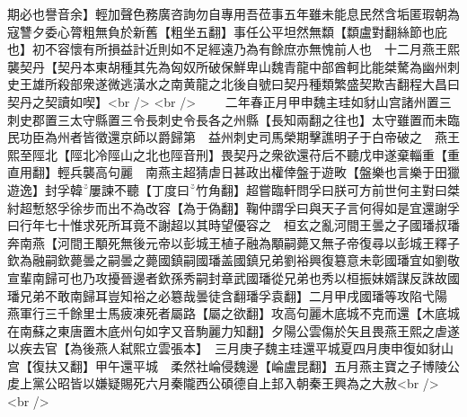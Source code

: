 期必也譽音余】輕加聲色務廣咨詢勿自專用吾莅事五年雖未能息民然含垢匿瑕朝為寇讐夕委心膂粗無負於新舊【粗坐五翻】事任公平坦然無纇【纇盧對翻絲節也庇也】初不容懷有所損益計近則如不足經遠乃為有餘庶亦無愧前人也　十二月燕王熙襲契丹【契丹本東胡種其先為匈奴所破保鮮卑山魏青龍中部酋軻比能桀驁為幽州刺史王雄所殺部衆遂微逃潢水之南黄龍之北後自號曰契丹種類繁盛契欺吉翻程大昌曰契丹之契讀如喫】<br />
<br />
　　二年春正月甲申魏主珪如豺山宫諸州置三刺史郡置三太守縣置三令長刺史令長各之州縣【長知兩翻之往也】太守雖置而未臨民功臣為州者皆徵還京師以爵歸第　益州刺史司馬榮期擊譙明子于白帝破之　燕王熙至陘北【陘北冷陘山之北也陘音刑】畏契丹之衆欲還苻后不聽戊申遂棄輜重【重直用翻】輕兵襲高句麗　南燕主超猜虐日甚政出權倖盤于遊畋【盤樂也言樂于田獵遊逸】封孚韓屢諫不聽【丁度曰竹角翻】超嘗臨軒問孚曰朕可方前世何主對曰桀紂超慙怒孚徐步而出不為改容【為于偽翻】鞠仲謂孚曰與天子言何得如是宜還謝孚曰行年七十惟求死所耳竟不謝超以其時望優容之　桓玄之亂河間王曇之子國璠叔璠奔南燕【河間王顒死無後元帝以彭城王植子融為顒嗣薨又無子帝復尋以彭城王釋子欽為融嗣欽薨曇之嗣曇之薨國鎮嗣國璠盖國鎮兄弟劉裕興復簒意未彰國璠宜如劉敬宣輩南歸可也乃攻擾晉邊者欽孫秀嗣封章武國璠從兄弟也秀以桓振妹婿謀反誅故國璠兄弟不敢南歸耳豈知裕之必簒哉曇徒含翻璠孚袁翻】二月甲戌國璠等攻陷弋陽　燕軍行三千餘里士馬疲凍死者屬路【屬之欲翻】攻高句麗木底城不克而還【木底城在南蘇之東唐置木底州句如字又音駒麗力知翻】夕陽公雲傷於矢且畏燕王熙之虐遂以疾去官【為後燕人弑熙立雲張本】　三月庚子魏主珪還平城夏四月庚申復如豺山宫【復扶又翻】甲午還平城　柔然社崘侵魏邊【崘盧昆翻】五月燕主寶之子博陵公䖍上黨公昭皆以嫌疑賜死六月秦隴西公碩德自上邽入朝秦王興為之大赦<br />
<br />
